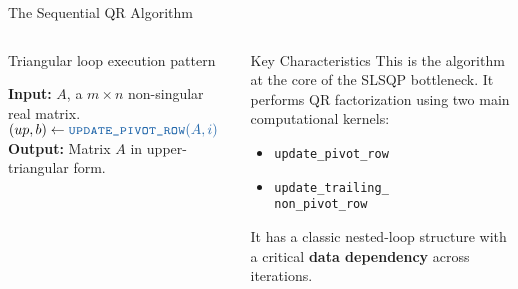 \begin{frame}{The Sequential QR Algorithm}
	
	\pause 
	\begin{columns}[c,onlytextwidth] %
	
	 \begin{block}{Triangular loop execution pattern}
		 \footnotesize %
		 \begin{algorithmic}[1]
		 \State \textbf{Input:} $A$, a $m \times n$ non-singular real matrix. %
			 \State $(up, b) \gets \textcolor{pivotblue}{\Call{\texttt{update\_pivot\_row}}{A, i}}$
			 	\State \textcolor{updategreen}{}
			 \EndFor
		 \EndFor
		 \State \textbf{Output:} Matrix $A$ in upper-triangular form.
		 \end{algorithmic}
	 \end{block}
	
	\pause 
	\begin{block}{Key Characteristics}
	This is the algorithm at the core of the SLSQP bottleneck. It performs  QR factorization using two main computational kernels: %
	\begin{itemize}
		\item \textcolor{pivotblue}{\texttt{update\_pivot\_row}}\normalcolor %
		\item \textcolor{updategreen}{\texttt{update\_trailing\_\\
				non\_pivot\_row}} \normalcolor %
	\end{itemize}
	\vspace{2mm}
	It has a classic nested-loop structure with a critical \textbf{data dependency} across iterations. %
	\end{block}
	 
	\end{columns}
\end{frame}
